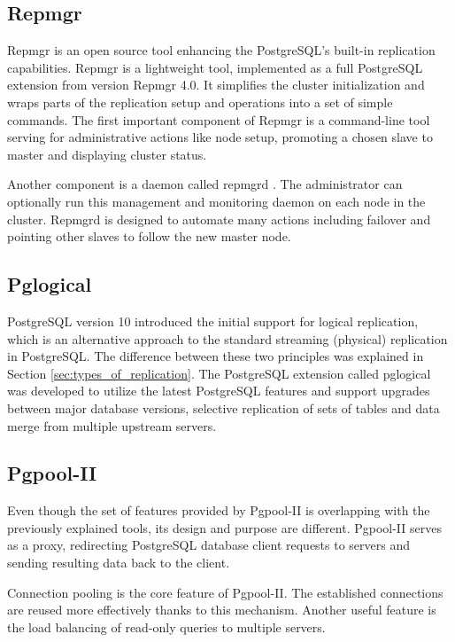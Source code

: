 \documentclass[
  digital, %
  twoside, %
  table,   %
  nolof,   %
  nolot,   %
]{fithesis3}
\begin{document}
\subsection{Repmgr} \label{sec:repmgr}
Repmgr \cite{repmgr} is an open source tool enhancing the PostgreSQL's built-in replication capabilities. Repmgr is a lightweight tool, implemented as a full PostgreSQL extension from version Repmgr 4.0. It simplifies the cluster initialization and wraps parts of the replication setup and operations into a set of simple commands.
The first important component of Repmgr is a command-line tool serving for administrative actions like node setup, promoting a chosen slave to master and displaying cluster status.

Another component is a daemon called repmgrd \cite{repmgrd}. The administrator can optionally run this management and monitoring daemon on each node in the cluster. Repmgrd is designed to automate many actions including failover and pointing other slaves to follow the new master node.

\subsection{Pglogical}
PostgreSQL version 10 introduced the initial support for logical replication, which is an alternative approach to the standard streaming (physical) replication in PostgreSQL. The difference between these two principles was explained in Section \ref{sec:types_of_replication}. The PostgreSQL extension called pglogical \cite{pglogical} was developed to utilize the latest PostgreSQL features and support upgrades between major database versions, selective replication of sets of tables and data merge from multiple upstream servers.

\subsection{Pgpool-II} \label{sec:pgpool}
Even though the set of features provided by Pgpool-II \cite{pgpool} is overlapping with the previously explained tools, its design and purpose are different. Pgpool-II serves as a proxy, redirecting PostgreSQL database client requests to servers and sending resulting data back to the client.

Connection pooling is the core feature of Pgpool-II. The established connections are reused more effectively thanks to this mechanism. Another useful feature is the load balancing of read-only queries to multiple servers.
\end{document}
